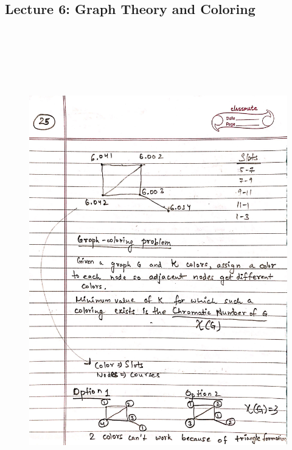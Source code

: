 \newpage
{\color{black} \subsection*{Lecture 6: Graph Theory and Coloring}}
\begin{figure}[H]
    \centering
    \includegraphics[width=16cm, height=21cm]{"./MIT-6.042J/MIT-6042J-025"}
\end{figure}


